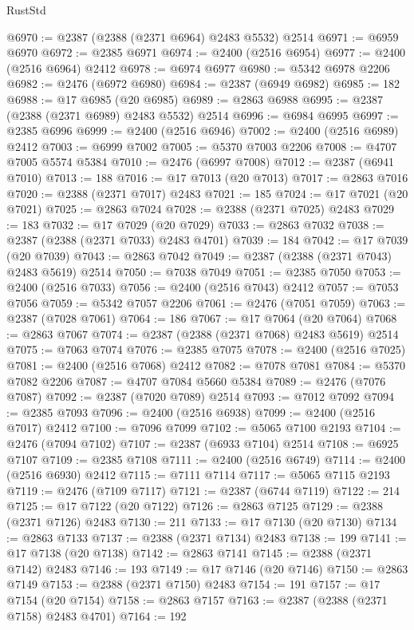 \begin{lexlean}{RustStd}
\begin{coremodule}
@6970 := @2387 (@2388 (@2371 @6964) @2483 @5532) @2514
@6971 := @6959 @6970
@6972 := @2385 @6971
@6974 := @2400 (@2516 @6954)
@6977 := @2400 (@2516 @6964) @2412
@6978 := @6974 @6977
@6980 := @5342 @6978 @2206
@6982 := @2476 (@6972 @6980)
@6984 := @2387 (@6949 @6982)
@6985 := 182
@6988 := @17 @6985 (@20 @6985)
@6989 := @2863 @6988
@6995 := @2387 (@2388 (@2371 @6989) @2483 @5532) @2514
@6996 := @6984 @6995
@6997 := @2385 @6996
@6999 := @2400 (@2516 @6946)
@7002 := @2400 (@2516 @6989) @2412
@7003 := @6999 @7002
@7005 := @5370 @7003 @2206
@7008 := @4707 @7005 @5574 @5384
@7010 := @2476 (@6997 @7008)
@7012 := @2387 (@6941 @7010)
@7013 := 188
@7016 := @17 @7013 (@20 @7013)
@7017 := @2863 @7016
@7020 := @2388 (@2371 @7017) @2483
@7021 := 185
@7024 := @17 @7021 (@20 @7021)
@7025 := @2863 @7024
@7028 := @2388 (@2371 @7025) @2483
@7029 := 183
@7032 := @17 @7029 (@20 @7029)
@7033 := @2863 @7032
@7038 := @2387 (@2388 (@2371 @7033) @2483 @4701)
@7039 := 184
@7042 := @17 @7039 (@20 @7039)
@7043 := @2863 @7042
@7049 := @2387 (@2388 (@2371 @7043) @2483 @5619) @2514
@7050 := @7038 @7049
@7051 := @2385 @7050
@7053 := @2400 (@2516 @7033)
@7056 := @2400 (@2516 @7043) @2412
@7057 := @7053 @7056
@7059 := @5342 @7057 @2206
@7061 := @2476 (@7051 @7059)
@7063 := @2387 (@7028 @7061)
@7064 := 186
@7067 := @17 @7064 (@20 @7064)
@7068 := @2863 @7067
@7074 := @2387 (@2388 (@2371 @7068) @2483 @5619) @2514
@7075 := @7063 @7074
@7076 := @2385 @7075
@7078 := @2400 (@2516 @7025)
@7081 := @2400 (@2516 @7068) @2412
@7082 := @7078 @7081
@7084 := @5370 @7082 @2206
@7087 := @4707 @7084 @5660 @5384
@7089 := @2476 (@7076 @7087)
@7092 := @2387 (@7020 @7089) @2514
@7093 := @7012 @7092
@7094 := @2385 @7093
@7096 := @2400 (@2516 @6938)
@7099 := @2400 (@2516 @7017) @2412
@7100 := @7096 @7099
@7102 := @5065 @7100 @2193
@7104 := @2476 (@7094 @7102)
@7107 := @2387 (@6933 @7104) @2514
@7108 := @6925 @7107
@7109 := @2385 @7108
@7111 := @2400 (@2516 @6749)
@7114 := @2400 (@2516 @6930) @2412
@7115 := @7111 @7114
@7117 := @5065 @7115 @2193
@7119 := @2476 (@7109 @7117)
@7121 := @2387 (@6744 @7119)
@7122 := 214
@7125 := @17 @7122 (@20 @7122)
@7126 := @2863 @7125
@7129 := @2388 (@2371 @7126) @2483
@7130 := 211
@7133 := @17 @7130 (@20 @7130)
@7134 := @2863 @7133
@7137 := @2388 (@2371 @7134) @2483
@7138 := 199
@7141 := @17 @7138 (@20 @7138)
@7142 := @2863 @7141
@7145 := @2388 (@2371 @7142) @2483
@7146 := 193
@7149 := @17 @7146 (@20 @7146)
@7150 := @2863 @7149
@7153 := @2388 (@2371 @7150) @2483
@7154 := 191
@7157 := @17 @7154 (@20 @7154)
@7158 := @2863 @7157
@7163 := @2387 (@2388 (@2371 @7158) @2483 @4701)
@7164 := 192

\end{coremodule}
\end{lexlean}
